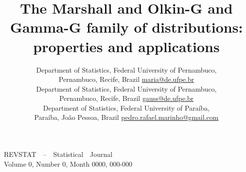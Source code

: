 \documentclass[twoside,leqno,11pt]{article}
\begin{document}
\thispagestyle{firstpage}

\vspace{-3.2cm}

\noindent
{\footnotesize {\sffamily REVSTAT~~--~~Statistical~~Journal\\[-1pt]
		Volume 0, Number 0, Month 0000,
		000-000}}

\vspace{1.5cm}
\title{The Marshall and Olkin-G and Gamma-G family of distributions: properties and applications}

\renewcommand{\titleheading}
{The MOGG family of distributions}  %

\author{ 
	{Department of Statistics,
		Federal University of Pernambuco,\\
        Pernambuco, Recife, Brazil
        \href{maria@de.ufpe.br}{maria@de.ufpe.br}}
	\\
	{Department of Statistics,
		Federal University of Pernambuco,\\
		Pernambuco, Recife, Brazil
		\href{gauss@de.ufpe.br}{gauss@de.ufpe.br}}
	\\
	{Department of Statistics,
		Federal University of Paraíba,\\
		Paraíba, João Pessoa, Brazil
		\href{pedro.rafael.marinho@gmail.com}{pedro.rafael.marinho@gmail.com}}
}
\renewcommand{\authorheading}
{Maria do Carmo S. Lima, Gauss M. Cordeiro and Pedro Rafael D. Marinho, }  %
\end{document}
